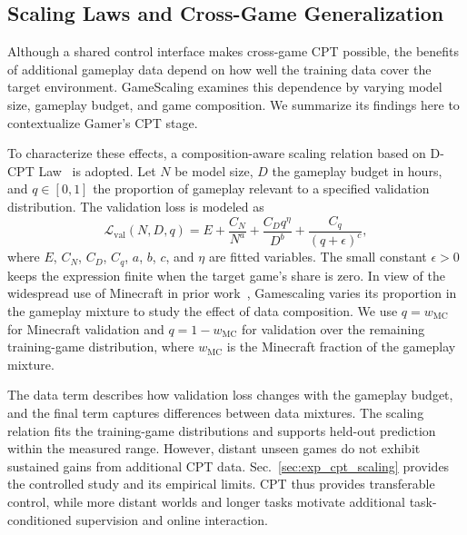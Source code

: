 \subsection{Scaling Laws and Cross-Game Generalization}
\label{sec:cpt_scaling}

Although a shared control interface makes cross-game CPT possible, the benefits of additional gameplay data depend on how well the training data cover the target environment. GameScaling \cite{gamescaling} examines this dependence by varying model size, gameplay budget, and game composition. We summarize its findings here to contextualize Gamer’s CPT stage.

To characterize these effects, a composition-aware scaling relation based on D-CPT Law~\cite{que2024dcpt} is adopted. Let $N$ be model size, $D$ the gameplay budget in hours, and $q\in[0,1]$ the proportion of gameplay relevant to a specified validation distribution. The validation loss is modeled as
\begin{equation}
\mathcal{L}_{\mathrm{val}}(N,D,q)
=E+\frac{C_N}{N^a}
+\frac{C_D q^\eta}{D^b}
+\frac{C_q}{(q+\epsilon)^c},
\label{eq:cpt_scaling_law}
\end{equation}
where $E$, $C_N$, $C_D$, $C_q$, $a$, $b$, $c$, and $\eta$ are fitted variables. The small constant $\epsilon>0$ keeps the expression finite when the target game's share is zero. In view of the widespread use of Minecraft in prior work~\cite{wang2025gametars,fan2022minedojo}, Gamescaling \cite{gamescaling} varies its proportion in the gameplay mixture to study the effect of data composition. We use $q=w_{\mathrm{MC}}$ for Minecraft validation and $q=1-w_{\mathrm{MC}}$ for validation over the remaining training-game distribution, where $w_{\mathrm{MC}}$ is the Minecraft fraction of the gameplay mixture.

The data term describes how validation loss changes with the gameplay budget, and the final term captures differences between data mixtures. The scaling relation fits the training-game distributions and supports held-out prediction within the measured range. However, distant unseen games do not exhibit sustained gains from additional CPT data. Sec.~\ref{sec:exp_cpt_scaling} provides the controlled study and its empirical limits. CPT thus provides transferable control, while more distant worlds and longer tasks motivate additional task-conditioned supervision and online interaction.